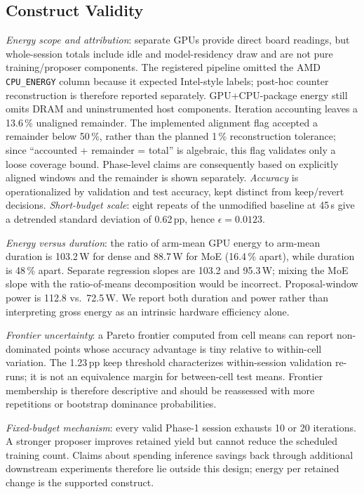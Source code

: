 \subsection{Construct Validity}
\emph{Energy scope and attribution}: separate GPUs provide direct board readings, but whole-session totals include idle and model-residency draw and are not pure training/proposer components. The registered pipeline omitted the AMD \texttt{CPU\_ENERGY} column because it expected Intel-style labels; post-hoc counter reconstruction is therefore reported separately. GPU+CPU-package energy still omits DRAM and uninstrumented host components. Iteration accounting leaves a 13.6\,\% unaligned remainder. The implemented alignment flag accepted a remainder below 50\,\%, rather than the planned 1\,\% reconstruction tolerance; since ``accounted + remainder = total'' is algebraic, this flag validates only a loose coverage bound. Phase-level claims are consequently based on explicitly aligned windows and the remainder is shown separately. \emph{Accuracy} is operationalized by validation and test accuracy, kept distinct from keep/revert decisions. \emph{Short-budget scale}: eight repeats of the unmodified baseline at 45\,s give a detrended standard deviation of 0.62\,pp, hence $\epsilon=0.0123$.

\emph{Energy versus duration}: the ratio of arm-mean GPU energy to arm-mean duration is 103.2\,W for dense and 88.7\,W for MoE (16.4\,\% apart), while duration is 48\,\% apart. Separate regression slopes are 103.2 and 95.3\,W; mixing the MoE slope with the ratio-of-means decomposition would be incorrect. Proposal-window power is 112.8 vs.\ 72.5\,W. We report both duration and power rather than interpreting gross energy as an intrinsic hardware efficiency alone.

\emph{Frontier uncertainty}: a Pareto frontier computed from cell means can report non-dominated points whose accuracy advantage is tiny relative to within-cell variation. The 1.23\,pp keep threshold characterizes within-session validation re-runs; it is not an equivalence margin for between-cell test means. Frontier membership is therefore descriptive and should be reassessed with more repetitions or bootstrap dominance probabilities.

\emph{Fixed-budget mechanism}: every valid Phase-1 session exhausts 10 or 20 iterations. A stronger proposer improves retained yield but cannot reduce the scheduled training count. Claims about spending inference savings back through additional downstream experiments therefore lie outside this design; energy per retained change is the supported construct.

